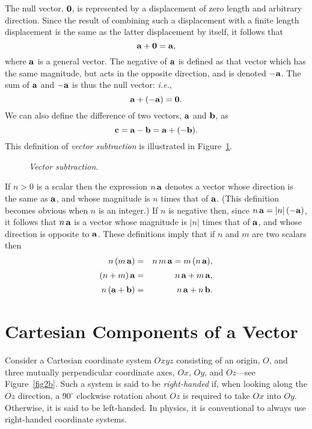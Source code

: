 The null vector, ${\bf 0}$, is represented by a displacement of zero length and arbitrary direction. 
Since the result of combining such a displacement with a  finite length displacement is the same
as the latter displacement by itself, it follows that
\begin{equation}
{\bf a} + {\bf 0} = {\bf a},
\end{equation}
where ${\bf a}$ is a general vector. 
The negative of ${\bf a}$ is defined as that vector which has the same magnitude, but  acts in the opposite direction, and is denoted $-{\bf a}$.
The sum of ${\bf a}$ and  $-{\bf a}$ is  thus
the null vector: {\em i.e.},
\begin{equation}
{\bf a} + (-{\bf a}) = {\bf 0}.
\end{equation}
We can also define the difference of two vectors, ${\bf a}$ and ${\bf b}$, as
\begin{equation}
{\bf c} = {\bf a} - {\bf b} = {\bf a} +(-{\bf b}).
\end{equation}
This definition of {\em vector subtraction}\/ is illustrated in Figure~\ref{fig2a}. 

\begin{figure}
\epsfysize=1.75in
\centerline{}
\caption{\em Vector subtraction.}\label{fig2a}
\end{figure}

If $n>0$ is a scalar then the expression $n\,{\bf a}$ denotes a vector whose direction is the same
as ${\bf a}$, and whose magnitude
is $n$ times that of ${\bf a}$. (This definition becomes obvious when $n$ is an integer.)
If $n$ is negative then, since $n\,{\bf a} = |n|\,(-{\bf a})$, it follows
that $n\,{\bf a}$ is a vector whose magnitude is $|n|$ times that of ${\bf a}$, and whose
direction is opposite to ${\bf a}$. These definitions imply that if $n$ and $m$ are
two scalars then
\begin{eqnarray}
n\,(m\,{\bf a}) &=& n\,m\,{\bf a} = m\,(n\,{\bf a}),\\[0.5ex]
(n+m)\,{\bf a} &=& n\,{\bf a} + m\,{\bf a},\\[0.5ex]
n\,({\bf a} + {\bf b}) &=& n\,{\bf a} + n\,{\bf b}.
\end{eqnarray}

\section{Cartesian Components of a Vector}
Consider a Cartesian coordinate system $Oxyz$ consisting of
an origin, $O$, and three mutually perpendicular coordinate axes, $Ox$, $Oy$, and
$Oz$---see Figure~\ref{fig2b}. Such a system is said to be {\em right-handed}\/  if, when looking along the $Oz$ direction, a $90^\circ$ clockwise
rotation about $Oz$  is required to take $Ox$ into $Oy$. Otherwise, it is said to be left-handed. In physics, it is conventional to always use   right-handed coordinate systems. 

